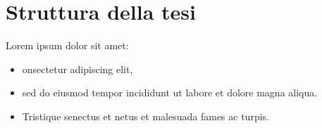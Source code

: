 \section[Struttura della tesi]{Struttura della tesi} %

Lorem ipsum dolor sit amet:
\begin{itemize}
    \item onsectetur adipiscing elit,
    \item sed do eiusmod tempor incididunt ut labore et dolore magna aliqua.
    \item Tristique senectus et netus et malesuada fames ac turpis.
\end{itemize}
